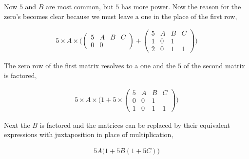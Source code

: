 Now $5$ and $B$ are most common, but $5$ has more power. Now the reason for the zero's becomes clear because we must leave a one in the place of the first row,

\begin{align*}
5 \times A \times \Big(
\begin{pmatrix}5 & A & B & C\\
               0 & 0 &   &  \end{pmatrix}
+
\begin{pmatrix}5 & A & B & C\\
               1 & 0 & 1 &  \\
               2 & 0 & 1 & 1\end{pmatrix}
\Big)
\end{align*}

The zero row of the first matrix resolves to a one and the $5$ of the second matrix is factored,

\begin{align*}
5 \times A \times \Big(1 
+ 5 \times 
\begin{pmatrix}5 & A & B & C\\
               0 & 0 & 1 &  \\
               1 & 0 & 1 & 1\end{pmatrix}
\Big)
\end{align*}

Next the $B$ is factored and the matrices can be replaced by their equivalent expressions with juxtaposition in place of multiplication,

\begin{align*}
5A \Big(1 + 5B(1 + 5C)\Big)
\end{align*}

